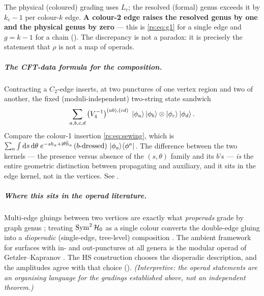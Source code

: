 \medskip
\noindent The physical (coloured) grading uses $L_c$; the resolved (formal) genus
exceeds it by $k_e-1$ per colour-$k$ edge. \textbf{A colour-2 edge raises the
resolved genus by one and the physical genus by zero} --- this is
\eqref{rs:eq:g1} for a single edge and $g=k-1$ for a chain (). The
discrepancy is not a paradox: it is precisely the statement that $\rho$ is not a
map of operads.

\subparagraph{The CFT-data formula for the composition.} Contracting a $C_2$-edge
inserts, at two punctures of one vertex region and two of another, the fixed
(moduli-independent) two-string state sandwich
\begin{equation}
	\sum_{a,b,c,d}\big(V_4^{-1}\big)^{(ab),(cd)}\;
	\ket{\phi_a}\ket{\phi_b}\otimes\ket{\phi_c}\ket{\phi_d}.
	\label{rs:eq:c2insert}
\end{equation}
Compare the colour-1 insertion \eqref{rs:eq:sewing}, which is
$\sum_a\int\mathrm{d} s\,\mathrm{d}\theta\;e^{-sh_a+\mathrm{i}\theta\bar h_a}\,(b\text{-dressed})\,
\ket{\phi_a}\mathinner{{}_{}\hspace{-2pt}\langle \phi^a |}$. The difference between the two kernels --- the presence
versus absence of the $(s,\theta)$ family and its $b$'s --- \emph{is} the entire
geometric distinction between propagating and auxiliary, and it sits in the edge
kernel, not in the vertices. See .

\subparagraph{Where this sits in the operad literature.} Multi-edge gluings between
two vertices are exactly what \emph{properads} grade by graph genus
\cite{Vallette2007}; treating $\operatorname{Sym}^2\mathcal{H}_0$ as a single colour converts the
double-edge gluing into a \emph{dioperadic} (single-edge, tree-level) composition
\cite{Gan2003}. The ambient framework for surfaces with in- and out-punctures at
all genera is the modular operad of Getzler--Kapranov \cite{GetzlerKapranov1998}.
The HS construction chooses the dioperadic description, and the amplitudes agree
with that choice (). \emph{(Interpretive: the operad statements
are an organising language for the gradings established above, not an independent
theorem.)}

